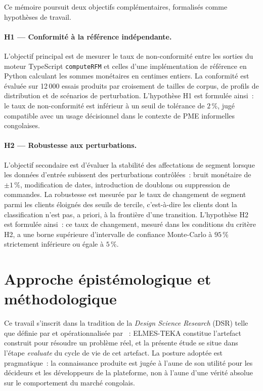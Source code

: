 Ce mémoire poursuit deux objectifs complémentaires, formalisés comme hypothèses de travail.

\paragraph{H1 — Conformité à la référence indépendante.}
L'objectif principal est de mesurer le taux de non-conformité entre les sorties du moteur
TypeScript \texttt{computeRFM} et celles d'une implémentation de référence en Python
calculant les sommes monétaires en centimes entiers. La conformité est évaluée sur
12\,000 essais produits par croisement de tailles de corpus, de profils de distribution et
de scénarios de perturbation. L'hypothèse H1 est formulée ainsi~: le taux de
non-conformité est inférieur à un seuil de tolérance de $2\,\%$, jugé compatible avec
un usage décisionnel dans le contexte de PME informelles congolaises.

\paragraph{H2 — Robustesse aux perturbations.}
L'objectif secondaire est d'évaluer la stabilité des affectations de segment lorsque les
données d'entrée subissent des perturbations contrôlées~: bruit monétaire de $\pm1\,\%$,
modification de dates, introduction de doublons ou suppression de commandes. La robustesse
est mesurée par le taux de changement de segment parmi les clients éloignés des seuils de
tercile, c'est-à-dire les clients dont la classification n'est pas, a priori, à la frontière
d'une transition. L'hypothèse H2 est formulée ainsi~: ce taux de changement, mesuré dans
les conditions du critère H2, a une borne supérieure d'intervalle de confiance Monte-Carlo
à $95\,\%$ strictement inférieure ou égale à $5\,\%$.

\section*{Approche épistémologique et méthodologique}

Ce travail s'inscrit dans la tradition de la \emph{Design Science Research} (DSR) telle que
définie par \citet{Hevner2004} et opérationnalisée par \citet{Peffers2008}~: ELMES-TEKA
constitue l'artefact construit pour résoudre un problème réel, et la présente étude se
situe dans l'étape \emph{evaluate} du cycle de vie de cet artefact. La posture adoptée est
pragmatique~: la connaissance produite est jugée à l'aune de son utilité pour les décideurs
et les développeurs de la plateforme, non à l'aune d'une vérité absolue sur le comportement
du marché congolais.

